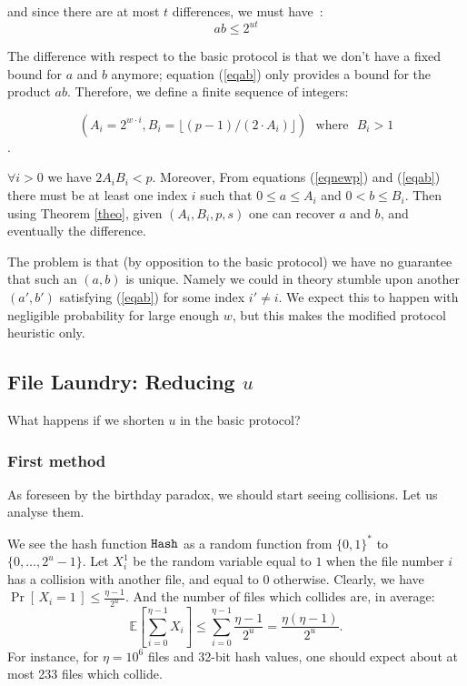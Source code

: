 \documentclass[11pt]{llncs}
\newcommand{\Prob}[1]{{\Pr\left[\,{#1}\,\right]}}
\newcommand{\EE}[1]{{\mathbb{E}\left[{#1}\right]}}
\begin{document}
and since there are at most $t$ differences, we must have~:
\begin{equation}
\label{eqab}
a b \leq 2^{ut}
\end{equation}

The difference with respect to the basic protocol is that we don't have a fixed bound for $a$ and $b$ anymore; equation (\ref{eqab}) only provides a bound for the product $a b$. Therefore, we define a finite sequence of integers:

$$(A_i=2^{w \cdot i},B_i=\lfloor (p-1)/(2 \cdot A_i) \rfloor)\mbox{~~where~~}B_i>1$$. 

$\forall i>0$ we have $2 A_i B_i<p$. Moreover, From equations (\ref{eqnewp}) and (\ref{eqab}) there must be at least one index $i$ such that $0 \leq a \leq A_i$ and $0 <b \leq B_i$. Then using Theorem \ref{theo}, given $(A_i,B_i,p,s)$ one can recover $a$ and $b$, and eventually the difference.\smallskip
 
The problem is that (by opposition to the basic protocol) we have no guarantee that such an $(a,b)$ is unique. Namely we could in theory stumble upon another $(a',b')$ satisfying (\ref{eqab}) for some index $i' \neq i$. We expect this to happen with negligible probability for large enough $w$, but this makes the modified protocol heuristic only.

\subsection{File Laundry: Reducing $u$}

What happens if we shorten $u$ in the basic protocol?\smallskip

\subsubsection{First method}

As foreseen by the birthday paradox, we should start seeing collisions.
Let us analyse them.

We see the hash function $\mbox{{\tt Hash}}$ as a random function from $\{0,1\}^*$ to $\{0,\dots,2^u-1\}$.
Let $X^1_i$ be the random variable equal to $1$ when the file number $i$ has a collision with another file, and equal to $0$ otherwise.
Clearly, we have $\Prob{X_i = 1} \le \frac{\eta -1}{2^u}$.
And the number of files which collides are, in average:
\[ \EE{\sum_{i=0}^{\eta-1} X_i} \le \sum_{i=0}^{\eta-1} \frac{\eta -1}{2^u} = \frac{\eta (\eta - 1)}{2^u}. \]
For instance, for $\eta=10^6$ files and 32-bit hash values, one should expect about at most 233 files which collide.\smallskip
\end{document}
